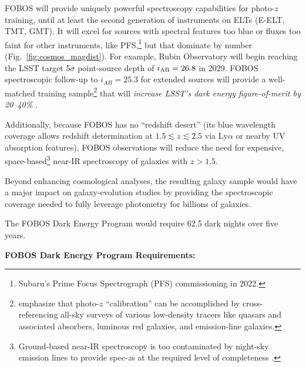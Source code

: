 \documentclass[11pt,a4paper,twoside,onecolumn,openany,final,oldfontcommands]{memoir}
\begin{document}
FOBOS will provide uniquely powerful spectroscopy capabilities for photo-$z$ training, until at least the second generation of instruments on ELTs (E-ELT, TMT, GMT).  It will excel for sources with spectral features too blue or fluxes too faint for other instruments, like PFS,\footnote{Subaru's Prime Focus Spectrograph (PFS) commissioning in 2022.} but that dominate by number (Fig.~\ref{fig:cosmos_magdist}).  For example, Rubin Observatory will begin reaching the LSST target 5$\sigma$ point-source depth of $i_{\rm AB} = 26.8$ in 2029.   FOBOS spectroscopic follow-up to $i_{AB} = 25.3$ for extended sources will provide a well-matched training sample\footnote{\citet{newman15} emphasize that photo-$z$ ``calibration'' can be accomplished by cross-referencing all-sky surveys of various low-density tracers like quasars and associated absorbers, luminous red galaxies, and emission-line galaxies.} that will \textit{increase LSST's dark energy figure-of-merit by 20--40\%} \citep{newman15}. 

 Additionally, because FOBOS has no ``redshift desert'' (its blue wavelength coverage allows redshift determination at $1.5\lesssim z \lesssim2.5$ via Ly$\alpha$ or nearby UV absorption features), FOBOS observations will reduce the need for expensive, space-based\footnote{Ground-based near-IR spectroscopy is too contaminated by night-sky emission lines to provide spec-$z$s at the required level of completeness \citep{newman15}.} near-IR spectroscopy of galaxies with $z > 1.5$.  

 Beyond enhancing cosmological analyses, the resulting galaxy sample would have a major impact on galaxy-evolution studies by providing the spectroscopic coverage needed to fully leverage photometry for billions of galaxies.  %

 The FOBOS Dark Energy Program would require 62.5 dark nights over five years.

\noindent \textbf{FOBOS Dark Energy Program Requirements:}
\end{document}
